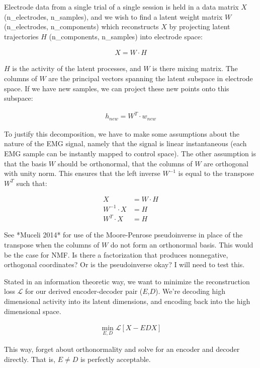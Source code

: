 \documentclass[../main.tex]{subfiles}
\begin{document}
Electrode data from a single trial of a single session is held in a data matrix $X$ (n\_electrodes, n\_samples), and we wish to find a latent weight matrix $W$ (n\_electrodes, n\_components) which reconstructs $X$ by projecting latent trajectories $H$ (n\_components, n\_samples) into electrode space:

\begin{align*}
X = W\cdot{H}
\end{align*}

$H$ is the activity of the latent processes, and $W$ is there mixing matrix. The columns of $W$ are the principal vectors spanning the latent subspace in electrode space. If we have new samples, we can project these new points onto this subspace:

\begin{align*}
h_{new} = W^T\cdot{w_{new}}
\end{align*}

To justify this decomposition, we have to make some assumptions about the nature of the EMG signal, namely that the signal is linear instantaneous (each EMG sample can be instantly mapped to control space). The other assumption is that the basis $W$ should be orthonormal, that the columns of $W$ are orthogonal with unity norm. This ensures that the left inverse $W^{-1}$ is equal to the transpose $W^T$ such that:

\begin{align*}
X &= W\cdot{H} \\
W^{-1}\cdot{X} &= {H} \\
W^{T}\cdot{X} &= {H}
\end{align*}

See *Muceli 2014* for use of the Moore-Penrose pseudoinverse in place of the transpose when the columns of $W$ do not form an orthonormal basis. This would be the case for NMF. Is there a factorization that produces nonnegative, orthogonal coordinates? Or is the pseudoinverse okay? I will need to test this.

Stated in an information theoretic way, we want to minimize the reconstruction loss $\mathcal{L}$ for our derived encoder-decoder pair ($E$,$D$). We're decoding high dimensional activity into its latent dimensions, and encoding back into the high dimensional space.

\begin{align}
  \min_{E,D}{\mathcal{L}\left[X - EDX\right]}
\end{align}

This way, forget about orthonormality and solve for an encoder and decoder directly. That is, $E\neq{D}$ is perfectly acceptable.
\end{document}

